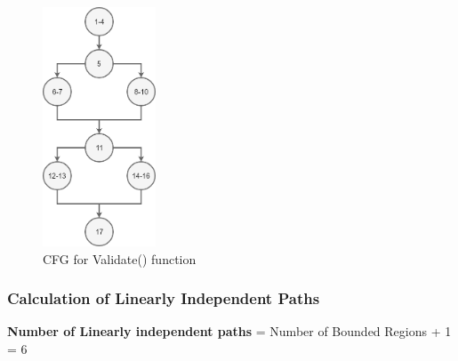 \documentclass{scrreprt}
\begin{document}
\begin{figure}[H]
\centering
\includegraphics[width=0.3\textwidth, keepaspectratio]{validateLogin.png}
\caption{CFG for Validate() function}
\end{figure}


\subsubsection{Calculation of Linearly Independent Paths}
\textbf{Number of Linearly independent paths} = Number of Bounded Regions + 1 = 6
\end{document}
